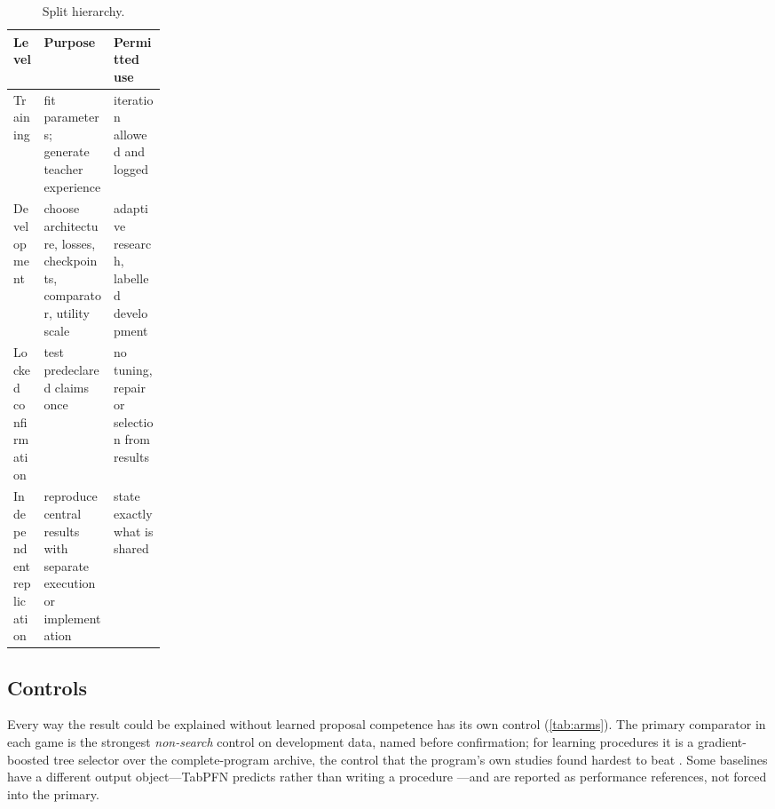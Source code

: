 \begin{table}[t]
\caption{Split hierarchy.}
\label{tab:splits}
\centering\tablesf
\begin{tabularx}{\linewidth}{@{}>{\raggedright\arraybackslash}p{0.2\linewidth}LL@{}}
\toprule
Level & Purpose & Permitted use \\
\midrule
Training & fit parameters; generate teacher experience & iteration allowed and logged \\
Development & choose architecture, losses, checkpoints, comparator, utility scale & adaptive research, labelled development \\
Locked confirmation & test predeclared claims once & no tuning, repair or selection from results \\
Independent replication & reproduce central results with separate execution or implementation & state exactly what is shared \\
\bottomrule
\end{tabularx}
\end{table}

\subsection{Controls}

Every way the result could be explained without learned proposal competence has its own control
(\cref{tab:arms}). The primary comparator in each game is the strongest \emph{non-search} control on
development data, named before confirmation; for learning procedures it is a gradient-boosted tree
selector over the complete-program archive, the control that the program's own studies found hardest
to beat \citep{jopedime2026h27}. Some baselines have a different output object---TabPFN predicts rather
than writing a procedure \citep{hollmann2025tabpfn,qu2025tabicl}---and are reported as performance
references, not forced into the primary.

